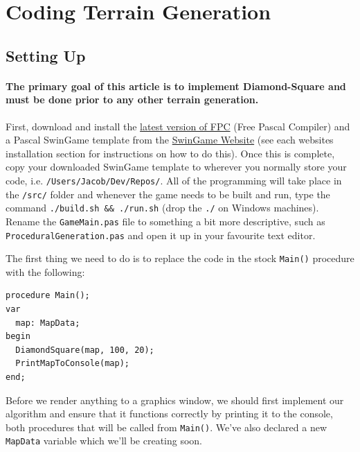 \documentclass{article}
\begin{document}
\section{Coding Terrain Generation}

\subsection{Setting Up}

\paragraph{The primary goal of this article is to implement Diamond-Square and must be done prior to any other terrain generation.}\mbox{}
First, download and install the \href{http://www.freepascal.org/download.var}{latest version of FPC} (Free Pascal Compiler) and a Pascal SwinGame template from the \href{http://swingame.com/index.php/downloads.html}{SwinGame Website} (see each websites installation section for instructions on how to do this). Once this is complete, copy your downloaded SwinGame template to wherever you normally store your code, i.e. \texttt{/Users/Jacob/Dev/Repos/}. All of the programming will take place in the \texttt{/src/} folder and whenever the game needs to be built and run, type the command \texttt{./build.sh && ./run.sh} (drop the \texttt{./} on Windows machines). Rename the \texttt{GameMain.pas} file to something a bit more descriptive, such as \texttt{ProceduralGeneration.pas} and open it up in your favourite text editor.

The first thing we need to do is to replace the code in the stock \texttt{Main()} procedure with the following:

\begin{verbatim}
procedure Main();
var
  map: MapData;
begin
  DiamondSquare(map, 100, 20);
  PrintMapToConsole(map);
end;
\end{verbatim}

Before we render anything to a graphics window, we should first implement our algorithm and ensure that it functions correctly by printing it to the console, both procedures that will be called from \texttt{Main()}. We've also declared a new \texttt{MapData} variable which we'll be creating soon.

\vspace{1mm}
\end{document}
